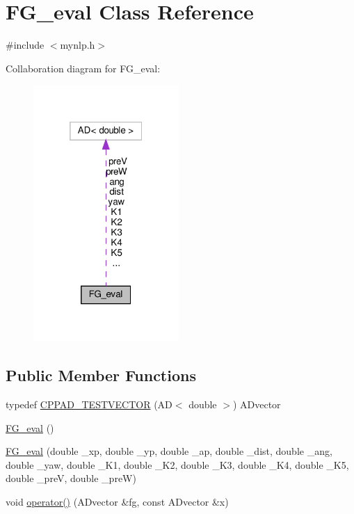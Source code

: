 \hypertarget{classFG__eval}{}\section{F\+G\+\_\+eval Class Reference}
\label{classFG__eval}


{\ttfamily \#include $<$mynlp.\+h$>$}



Collaboration diagram for F\+G\+\_\+eval\+:
\nopagebreak
\begin{figure}[H]
\begin{center}
\leavevmode
\includegraphics[width=157pt]{classFG__eval__coll__graph}
\end{center}
\end{figure}
\subsection*{Public Member Functions}
\begin{DoxyCompactItemize}
\item 
typedef \hyperlink{classFG__eval_aa996df77a971dedd5d5715ef6be1258e}{C\+P\+P\+A\+D\+\_\+\+T\+E\+S\+T\+V\+E\+C\+T\+OR} (AD$<$ double $>$) A\+Dvector
\item 
\hyperlink{classFG__eval_a0a9e41e75d2ab3597a535a73b2a30ede}{F\+G\+\_\+eval} ()
\item 
\hyperlink{classFG__eval_af179064157f6328d47b2ce44c2d30a3e}{F\+G\+\_\+eval} (double \+\_\+xp, double \+\_\+yp, double \+\_\+ap, double \+\_\+dist, double \+\_\+ang, double \+\_\+yaw, double \+\_\+\+K1, double \+\_\+\+K2, double \+\_\+\+K3, double \+\_\+\+K4, double \+\_\+\+K5, double \+\_\+preV, double \+\_\+preW)
\item 
void \hyperlink{classFG__eval_ae4a15abb127b46d10bca1f1619faf248}{operator()} (A\+Dvector \&fg, const A\+Dvector \&x)
\end{DoxyCompactItemize}
